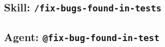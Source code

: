 \documentclass[12pt]{article}
\begin{document}
\subsection{Skill: \texttt{/fix-bugs-found-in-tests}}
\label{app:skill:fix-bugs-found-in-tests}



\subsection{Agent: \texttt{@fix-bug-found-in-test}}
\label{app:agent:fix-bug-found-in-test}


\end{document}
